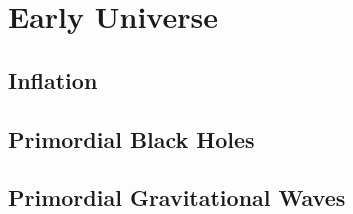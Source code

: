 \chapter{Early Universe}
\section{Inflation}

\section{Primordial Black Holes}

\section{Primordial Gravitational Waves}